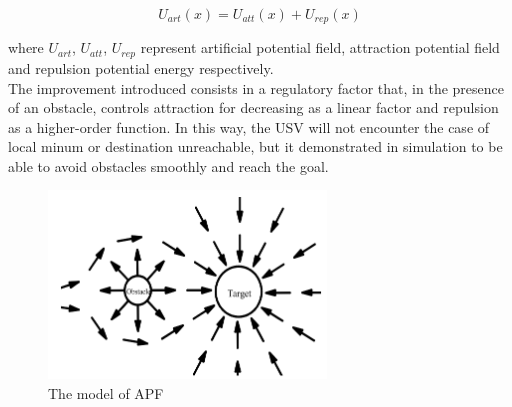 \documentclass[12pt]{article}
\begin{document}
                  \begin{equation} \label{eq:apf}
                         U_{art}(x) = U_{att}(x) + U_{rep}(x)
                  \end{equation}

              where $U_{art}$, $U_{att}$, $U_{rep}$ represent artificial potential field, attraction potential field and repulsion potential energy respectively.\\
              The improvement introduced consists in a regulatory factor that, in the presence of an obstacle, controls attraction for decreasing as a linear factor and repulsion as a higher-order function. In this way, the USV will not encounter the case of local minum or destination unreachable, but it demonstrated in simulation to be able to avoid obstacles smoothly and reach the goal.

              \begin{figure}
                    \centering
                    \includegraphics[height=5cm]{./Images/Xie/apf}
                    \caption{The model of APF}
                    \label{fig:apf}
              \end{figure}
\end{document}

